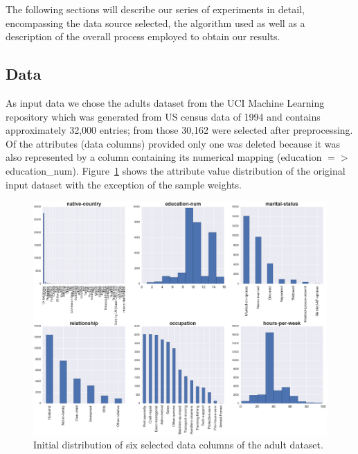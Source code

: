 \documentclass{llncs}
\begin{document}
The following sections will describe our series of experiments in detail, encompassing the data source selected, the algorithm used as well as a description of the overall process employed to obtain our results.


\subsection{Data} 
\label{ssect:data}

As input data we chose the adults dataset from the UCI Machine Learning repository which was generated from US census data of 1994 and contains approximately 32,000 entries; from those 30,162 were selected after preprocessing. Of the attributes (data columns) provided only one was deleted because it was also represented by a column containing its numerical mapping (education $=>$ education\_num). Figure~\ref{fig:adult_original_distribution} shows the attribute value distribution of the original input dataset with the exception of the sample weights.


\begin{figure}[!t]
	\begin{center}
    \hspace*{-0.8cm}
		\includegraphics[width=1.1\textwidth]{figures/theory/dist_initial_small}
		\caption{Initial distribution of six selected data columns of the adult dataset.}
		\label{fig:adult_original_distribution}
	\end{center}
\end{figure}
\end{document}
